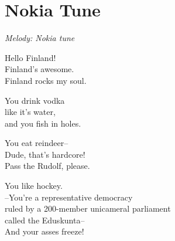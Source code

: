 \section{Nokia Tune}

\textit{Melody: Nokia tune}

Hello Finland!\\
Finland's awesome.\\
Finland rocks my soul.

You drink vodka\\
like it's water,\\
and you fish in holes.

You eat reindeer--\\
Dude, that's hardcore!\\
Pass the Rudolf, please.

You like hockey.\\
--You're a representative democracy\\
ruled by a 200-member unicameral parliament\\
called the Eduskunta--\\
And your asses freeze!